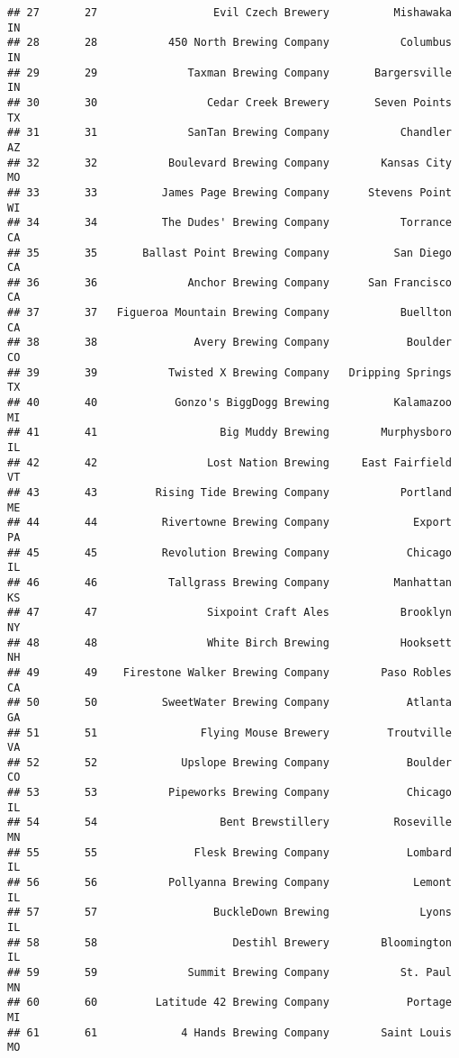 \documentclass[
]{article}
\begin{document}
\begin{verbatim}
## 27       27                  Evil Czech Brewery          Mishawaka    IN
## 28       28           450 North Brewing Company           Columbus    IN
## 29       29              Taxman Brewing Company       Bargersville    IN
## 30       30                 Cedar Creek Brewery       Seven Points    TX
## 31       31              SanTan Brewing Company           Chandler    AZ
## 32       32           Boulevard Brewing Company        Kansas City    MO
## 33       33          James Page Brewing Company      Stevens Point    WI
## 34       34          The Dudes' Brewing Company           Torrance    CA
## 35       35       Ballast Point Brewing Company          San Diego    CA
## 36       36              Anchor Brewing Company      San Francisco    CA
## 37       37   Figueroa Mountain Brewing Company           Buellton    CA
## 38       38               Avery Brewing Company            Boulder    CO
## 39       39           Twisted X Brewing Company   Dripping Springs    TX
## 40       40            Gonzo's BiggDogg Brewing          Kalamazoo    MI
## 41       41                   Big Muddy Brewing        Murphysboro    IL
## 42       42                 Lost Nation Brewing     East Fairfield    VT
## 43       43         Rising Tide Brewing Company           Portland    ME
## 44       44          Rivertowne Brewing Company             Export    PA
## 45       45          Revolution Brewing Company            Chicago    IL
## 46       46           Tallgrass Brewing Company          Manhattan    KS
## 47       47                 Sixpoint Craft Ales           Brooklyn    NY
## 48       48                 White Birch Brewing           Hooksett    NH
## 49       49    Firestone Walker Brewing Company        Paso Robles    CA
## 50       50          SweetWater Brewing Company            Atlanta    GA
## 51       51                Flying Mouse Brewery         Troutville    VA
## 52       52             Upslope Brewing Company            Boulder    CO
## 53       53           Pipeworks Brewing Company            Chicago    IL
## 54       54                   Bent Brewstillery          Roseville    MN
## 55       55               Flesk Brewing Company            Lombard    IL
## 56       56           Pollyanna Brewing Company             Lemont    IL
## 57       57                  BuckleDown Brewing              Lyons    IL
## 58       58                     Destihl Brewery        Bloomington    IL
## 59       59              Summit Brewing Company           St. Paul    MN
## 60       60         Latitude 42 Brewing Company            Portage    MI
## 61       61             4 Hands Brewing Company        Saint Louis    MO

\end{verbatim}
\end{document}
